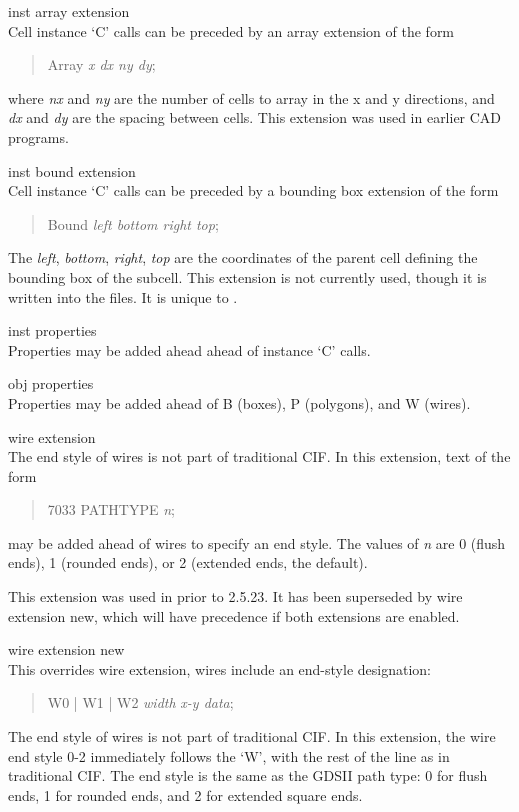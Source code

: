 \begin{description}
\item{\cb inst array extension}\\
Cell instance `{\vt C}' calls can be preceded by an array
extension of the form
\begin{quote}
{ Array} {\it x dx ny dy}{\vt ;}
\end{quote}
where {\it nx} and {\it ny} are the number of cells to array in the x
and y directions, and {\it dx} and {\it dy} are the spacing between
cells.  This extension was used in earlier CAD programs.

\item{\cb inst bound extension}\\
Cell instance `{\vt C}' calls can be preceded by a bounding box
extension of the form
\begin{quote}
{ Bound} {\it left bottom right top}{\vt ;}
\end{quote}
The {\it left}, {\it bottom}, {\it right}, {\it top} are the
coordinates of the parent cell defining the bounding box of the
subcell.  This extension is not currently used, though it is written
into the files.  It is unique to {\Xic}.

\item{\cb inst properties}\\
Properties may be added ahead ahead of instance `{\vt C}' calls.

\item{\cb obj properties}\\
Properties may be added ahead of {\vt B} (boxes), {\vt P} (polygons),
and {\vt W} (wires).

\item{\cb wire extension}\\
The end style of wires is not part of traditional CIF.  In this
extension, text of the form
\begin{quote}
{ 7033 PATHTYPE} {\it n\/}{\vt ;}
\end{quote}
may be added ahead of wires to specify an end style.  The values of
{\it n} are 0 (flush ends), 1 (rounded ends), or 2 (extended ends, the
default).

This extension was used in {\Xic} prior to 2.5.23.  It has been
superseded by {\cb wire extension new}, which will have precedence if
both extensions are enabled.

\item{\cb wire extension new}\\
This overrides {\cb wire extension}, wires include an end-style
designation:
\begin{quote}
{\vt W0 | W1 | W2}  {\it width} {\it x-y data}{\vt ;}
\end{quote}
The end style of wires is not part of traditional CIF.  In this
extension, the wire end style 0-2 immediately follows the `{\vt W}',
with the rest of the line as in traditional CIF.  The end style is the
same as the GDSII path type:  0 for flush ends, 1 for rounded ends,
and 2 for extended square ends.


\end{description}
